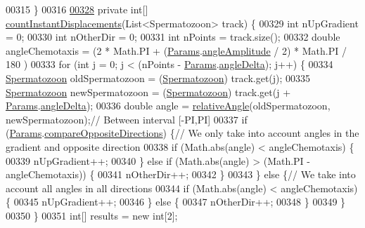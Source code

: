 \begin{DoxyCode}
{00315   \}
00316 
\hypertarget{_chemotaxis_8java_source_l00328}{}\hyperlink{classanalysis_1_1_chemotaxis_a668ad1c1240012d6fb70c1fac4a219be}{00328}   \textcolor{keyword}{private} \textcolor{keywordtype}{int}[] \hyperlink{classanalysis_1_1_chemotaxis_a668ad1c1240012d6fb70c1fac4a219be}{countInstantDisplacements}(List<Spermatozoon> track) \{
00329     \textcolor{keywordtype}{int} nUpGradient = 0;
00330     \textcolor{keywordtype}{int} nOtherDir = 0;
00331     \textcolor{keywordtype}{int} nPoints = track.size();
00332     \textcolor{keywordtype}{double} angleChemotaxis = (2 * Math.PI + (\hyperlink{classdata_1_1_params}{Params}.\hyperlink{classdata_1_1_params_a42568ad774d8f4ccb9535aeda39fc883}{angleAmplitude} / 2) * Math.PI / 180
      ) %
00333     \textcolor{keywordflow}{for} (\textcolor{keywordtype}{int} j = 0; j < (nPoints - \hyperlink{classdata_1_1_params}{Params}.\hyperlink{classdata_1_1_params_a93caa48162e34b2227a839ed71b4ed44}{angleDelta}); j++) \{
00334       \hyperlink{classdata_1_1_spermatozoon}{Spermatozoon} oldSpermatozoon = (\hyperlink{classdata_1_1_spermatozoon}{Spermatozoon}) track.get(j);
00335       \hyperlink{classdata_1_1_spermatozoon}{Spermatozoon} newSpermatozoon = (\hyperlink{classdata_1_1_spermatozoon}{Spermatozoon}) track.get(j + 
      \hyperlink{classdata_1_1_params}{Params}.\hyperlink{classdata_1_1_params_a93caa48162e34b2227a839ed71b4ed44}{angleDelta});
00336       \textcolor{keywordtype}{double} angle = \hyperlink{classanalysis_1_1_chemotaxis_ab23f946e0f1055d348e975e3058f323d}{relativeAngle}(oldSpermatozoon, newSpermatozoon);\textcolor{comment}{// Between interval
       [-PI,PI]}
00337       \textcolor{keywordflow}{if} (\hyperlink{classdata_1_1_params}{Params}.\hyperlink{classdata_1_1_params_a8c0dba3f8308ea1257549b3cef11ea23}{compareOppositeDirections}) \{\textcolor{comment}{// We only take into account
       angles in the gradient and opposite direction}
00338         \textcolor{keywordflow}{if} (Math.abs(angle) < angleChemotaxis) \{
00339           nUpGradient++;
00340         \} \textcolor{keywordflow}{else} \textcolor{keywordflow}{if} (Math.abs(angle) > (Math.PI - angleChemotaxis)) \{
00341           nOtherDir++;
00342         \}
00343       \} \textcolor{keywordflow}{else} \{\textcolor{comment}{// We take into account all angles in all directions}
00344         \textcolor{keywordflow}{if} (Math.abs(angle) < angleChemotaxis) \{
00345           nUpGradient++;
00346         \} \textcolor{keywordflow}{else} \{
00347           nOtherDir++;
00348         \}
00349       \}
00350     \}
00351     \textcolor{keywordtype}{int}[] results = \textcolor{keyword}{new} \textcolor{keywordtype}{int}[2];
}
\end{DoxyCode}
